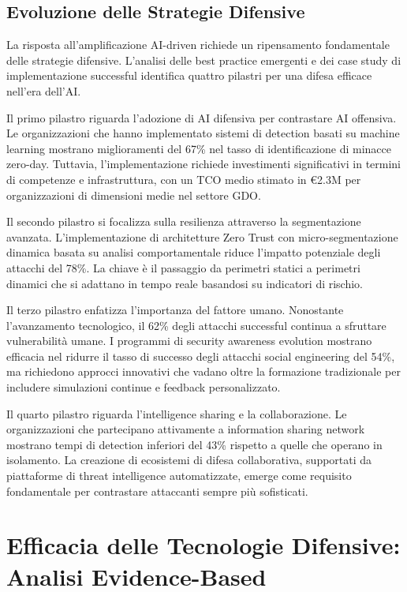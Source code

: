 \subsection{Evoluzione delle Strategie Difensive}

La risposta all'amplificazione AI-driven richiede un ripensamento fondamentale delle strategie difensive. L'analisi delle best practice emergenti e dei case study di implementazione successful identifica quattro pilastri per una difesa efficace nell'era dell'AI.

Il primo pilastro riguarda l'adozione di AI difensiva per contrastare AI offensiva. Le organizzazioni che hanno implementato sistemi di detection basati su machine learning mostrano miglioramenti del 67\% nel tasso di identificazione di minacce zero-day. Tuttavia, l'implementazione richiede investimenti significativi in termini di competenze e infrastruttura, con un TCO medio stimato in €2.3M per organizzazioni di dimensioni medie nel settore GDO.

Il secondo pilastro si focalizza sulla resilienza attraverso la segmentazione avanzata. L'implementazione di architetture Zero Trust con micro-segmentazione dinamica basata su analisi comportamentale riduce l'impatto potenziale degli attacchi del 78\%. La chiave è il passaggio da perimetri statici a perimetri dinamici che si adattano in tempo reale basandosi su indicatori di rischio.

Il terzo pilastro enfatizza l'importanza del fattore umano. Nonostante l'avanzamento tecnologico, il 62\% degli attacchi successful continua a sfruttare vulnerabilità umane. I programmi di security awareness evolution mostrano efficacia nel ridurre il tasso di successo degli attacchi social engineering del 54\%, ma richiedono approcci innovativi che vadano oltre la formazione tradizionale per includere simulazioni continue e feedback personalizzato.

Il quarto pilastro riguarda l'intelligence sharing e la collaborazione. Le organizzazioni che partecipano attivamente a information sharing network mostrano tempi di detection inferiori del 43\% rispetto a quelle che operano in isolamento. La creazione di ecosistemi di difesa collaborativa, supportati da piattaforme di threat intelligence automatizzate, emerge come requisito fondamentale per contrastare attaccanti sempre più sofisticati.

\section{Efficacia delle Tecnologie Difensive: Analisi Evidence-Based}


